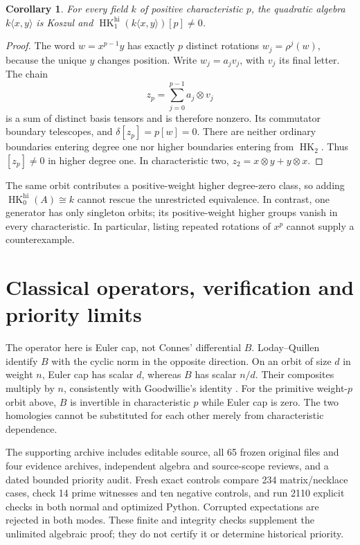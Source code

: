 \documentclass[10pt]{article}
\newtheorem{corollary}[proposition]{Corollary}
\newcommand{\HK}{\operatorname{HK}}
\begin{document}
\begin{corollary}\label{cor:counterexample}
For every field \(k\) of positive characteristic \(p\), the quadratic
algebra \(k\langle x,y\rangle\) is Koszul and
\(\HK_1^{\mathrm{hi}}(k\langle x,y\rangle)[p]\ne0\).
\end{corollary}
\begin{proof}
The word \(w=x^{p-1}y\) has exactly \(p\) distinct rotations
\(w_j=\rho^j(w)\), because the unique \(y\) changes position.
Write \(w_j=a_jv_j\), with \(v_j\) its final letter. The chain
\[
 z_p=\sum_{j=0}^{p-1}a_j\otimes v_j
\]
is a sum of distinct basis tensors and is therefore nonzero.
Its commutator boundary telescopes, and
\(\delta[z_p]=p[w]=0\). There are neither ordinary boundaries
entering degree one nor higher boundaries entering from \(\HK_2\).
Thus \([z_p]\ne0\) in higher degree one.
In characteristic two, \(z_2=x\otimes y+y\otimes x\).
\end{proof}

The same orbit contributes a positive-weight higher degree-zero class,
so adding \(\HK_0^{\mathrm{hi}}(A)\cong k\) cannot rescue the unrestricted
equivalence. In contrast, one generator has only singleton orbits;
its positive-weight higher groups vanish in every characteristic.
In particular, listing repeated rotations of \(x^p\) cannot supply
a counterexample.

\section{Classical operators, verification and priority limits}
The operator here is Euler cap, not Connes' differential \(B\).
Loday--Quillen \cite[Lemma~5.3]{LQ} identify \(B\) with the cyclic
norm in the opposite direction. On an orbit of size \(d\) in
weight \(n\), Euler cap has scalar \(d\), whereas \(B\) has scalar
\(n/d\). Their composites multiply by \(n\), consistently with
Goodwillie's identity \cite[Theorem~II.4.2]{G}. For the primitive
weight-\(p\) orbit above, \(B\) is invertible in characteristic \(p\)
while Euler cap is zero. The two homologies cannot be substituted
for each other merely from characteristic dependence.

The supporting archive includes editable source, all 65 frozen original
files and four evidence archives, independent algebra and source-scope
reviews, and a dated bounded priority audit. Fresh exact controls compare
234 matrix/necklace cases, check 14 prime witnesses and ten negative
controls, and run 2110 explicit checks in both normal and optimized
Python. Corrupted expectations are rejected in both modes.
These finite and integrity checks supplement the unlimited algebraic
proof; they do not certify it or determine historical priority.
\end{document}
